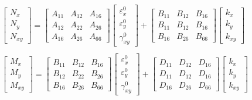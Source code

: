 \documentclass[USenglish]{article}
\begin{document}
\begin{equation} \label{eq:force_and_moments}
	\begin{array}{l}
	\begin{bmatrix}
		N_x \\
		N_y \\
		N_{xy}
	\end{bmatrix}
	=
	\begin{bmatrix}
		A_{11} & A_{12} & A_{16} \\
		A_{12} & A_{22} & A_{26} \\
		A_{16} & A_{26} & A_{66} 
	\end{bmatrix}
    \begin{bmatrix}
		\varepsilon_x^0 \\
        \varepsilon_y^0 \\
		\gamma_{xy}^0
    \end{bmatrix}  
	+              
	\begin{bmatrix}
		B_{11} & B_{12} & B_{16} \\
		B_{11} & B_{12} & B_{16} \\
		B_{16} & B_{26} & B_{66} 
	\end{bmatrix}
	\begin{bmatrix}
		k_x \\
		k_y \\
		k_{xy} 
	\end{bmatrix}  \\
	\\

	\begin{bmatrix}
		M_x \\
		M_y \\
		M_{xy}
	\end{bmatrix}
	=
	\begin{bmatrix}
		B_{11} & B_{12} & B_{16} \\
		B_{12} & B_{22} & B_{26} \\
		B_{16} & B_{26} & B_{66} 
	\end{bmatrix}
    \begin{bmatrix}
		\varepsilon_x^0 \\
        \varepsilon_y^0 \\
		\gamma_{xy}^0
    \end{bmatrix} 
	+ 
	\begin{bmatrix}
		D_{11} & D_{12} & D_{16} \\
		D_{11} & D_{12} & D_{16} \\
		D_{16} & D_{26} & D_{66} 
	\end{bmatrix}
	\begin{bmatrix}
		k_x \\
		k_y \\
		k_{xy} 
	\end{bmatrix}
	\end{array}
\end{equation}
\end{document}
